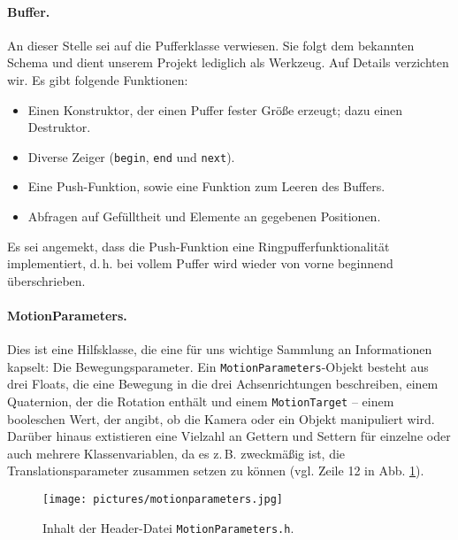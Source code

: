 	\paragraph{Buffer.} An dieser Stelle sei auf die Pufferklasse verwiesen. Sie folgt dem bekannten Schema und dient unserem Projekt lediglich als Werkzeug. Auf Details verzichten wir. Es gibt folgende Funktionen:
	\begin{itemize}
	\item Einen Konstruktor, der einen Puffer fester Größe erzeugt; dazu einen Destruktor.
	\item Diverse Zeiger (\texttt{begin}, \texttt{end} und \texttt{next}).
	\item Eine Push-Funktion, sowie eine Funktion zum Leeren des Buffers.
	\item Abfragen auf Gefülltheit und Elemente an gegebenen Positionen.
	\end{itemize}
	Es sei angemekt, dass die Push-Funktion eine Ringpufferfunktionalität implementiert, d.\,h. bei vollem Puffer wird wieder von vorne beginnend überschrieben.\par\medskip
	\paragraph{MotionParameters.} Dies ist eine Hilfsklasse, die eine für uns wichtige Sammlung an Informationen kapselt: Die Bewegungsparameter. Ein \texttt{MotionParameters}-Objekt besteht aus drei Floats, die eine Bewegung in die drei Achsenrichtungen beschreiben, einem Quaternion, der die Rotation enthält und einem \glqq \texttt{MotionTarget}\grqq{} -- einem booleschen Wert, der angibt, ob die Kamera oder ein Objekt manipuliert wird. Darüber hinaus extistieren eine Vielzahl an Gettern und Settern für einzelne oder auch mehrere Klassenvariablen, da es z.\,B.  zweckmäßig ist, die Translationsparameter zusammen setzen zu können (vgl. Zeile 12 in Abb. \ref{fig:motpar}).
	\begin{figure}[h]
	\centering
	\texttt{[image: pictures/motionparameters.jpg]}
	\caption{Inhalt der Header-Datei \texttt{MotionParameters.h}.}\label{fig:motpar}
	\end{figure}\par\medskip
